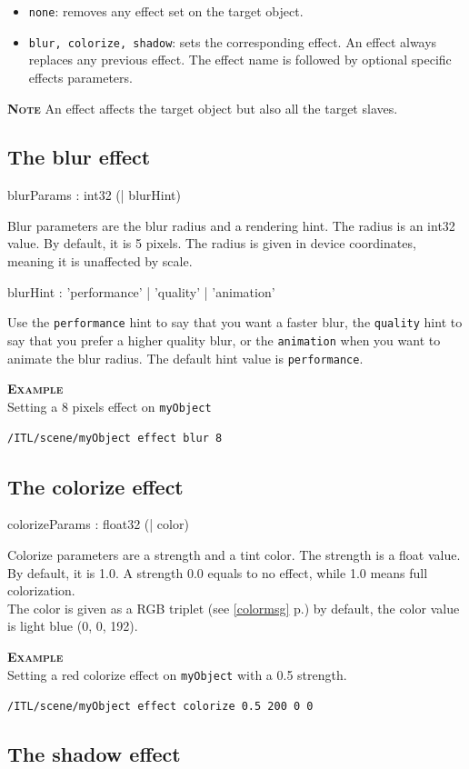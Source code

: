 \documentclass[a4paper,twoside]{report}
\newcommand{\subsublevel}[1]	{\subsection{#1}}
\newcommand{\fullref}[1]	{\ref{#1} p.\pageref{#1}}
\newcommand{\OSC}[1]		{\texttt{#1}}
\newcommand{\example}		{\textbf{\hspace{-1.5cm}\textbf{\textsc{Example }}}}
\newcommand{\note}	[1]		{\vspace{2mm}\textbf{\hspace{-1.03cm}\textbf{\textsc{Note #1}}}}
\newcommand{\sample}	[1]			{\vspace{-2mm}\begin{center}\colorbox{mygrey}{
								\begin{minipage}[t]{0.9\columnwidth} 
								{\small \texttt{#1}}
								\end{minipage}}\end{center}}
\begin{document}
\begin{itemize}
\item \OSC{none}: removes any effect set on the target object.
\item \OSC{blur, colorize, shadow}: sets the corresponding effect. An effect always replaces any previous effect. The effect name is followed by optional specific effects parameters.
\end{itemize}

\note{} An effect affects the target object but also all the target slaves.

\subsublevel{The blur effect}

\begin{rail}
blurParams : int32 (| blurHint)
\end{rail}

Blur parameters are the blur radius and a rendering hint. The radius is an int32 value. By default, it is 5 pixels. The radius is given in device coordinates, meaning it is unaffected by scale. 

\begin{rail}
blurHint : 'performance' | 'quality' | 'animation'
\end{rail}
Use the \OSC{performance} hint to say that you want a faster blur, the \OSC{quality} hint to say that you prefer a higher quality blur, or the \OSC{animation} when you want to animate the blur radius. The default hint value is \OSC{performance}.

\example \\
Setting a 8 pixels effect on \OSC{myObject}
\sample{/ITL/scene/myObject effect blur 8}

\subsublevel{The colorize effect}

\begin{rail}
colorizeParams : float32 (| color)
\end{rail}

Colorize parameters are a strength and a tint color. The strength is a float value. By default, it is 1.0. A strength 0.0 equals to no effect, while 1.0 means full colorization. \\
The color is given as a RGB triplet (see \fullref{colormsg}) by default, the color value is light blue (0, 0, 192).

\example \\
Setting a red colorize effect on \OSC{myObject} with a 0.5 strength.
\sample{/ITL/scene/myObject effect colorize 0.5 200 0 0}


\subsublevel{The shadow effect}
\end{document}
